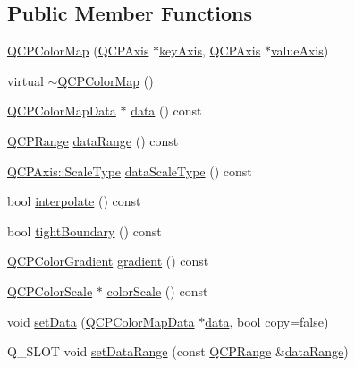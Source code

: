 \subsection*{Public Member Functions}
\begin{DoxyCompactItemize}
\item 
\hyperlink{class_q_c_p_color_map_aa37e976d2ee1e2be6c4cd88a64b36215}{Q\+C\+P\+Color\+Map} (\hyperlink{class_q_c_p_axis}{Q\+C\+P\+Axis} $\ast$\hyperlink{class_q_c_p_abstract_plottable_a72c7a09c22963f2c943f07112b311103}{key\+Axis}, \hyperlink{class_q_c_p_axis}{Q\+C\+P\+Axis} $\ast$\hyperlink{class_q_c_p_abstract_plottable_a3106f9d34d330a6097a8ec5905e5b519}{value\+Axis})
\item 
virtual \hyperlink{class_q_c_p_color_map_ac8a952a40fed62dcee33405b0f4d47ad}{$\sim$\+Q\+C\+P\+Color\+Map} ()
\item 
\hyperlink{class_q_c_p_color_map_data}{Q\+C\+P\+Color\+Map\+Data} $\ast$ \hyperlink{class_q_c_p_color_map_a3ae12c9ce842352037cd20ea5267414f}{data} () const 
\item 
\hyperlink{class_q_c_p_range}{Q\+C\+P\+Range} \hyperlink{class_q_c_p_color_map_a37cc8e821e070697e15652f6419fab48}{data\+Range} () const 
\item 
\hyperlink{class_q_c_p_axis_a36d8e8658dbaa179bf2aeb973db2d6f0}{Q\+C\+P\+Axis\+::\+Scale\+Type} \hyperlink{class_q_c_p_color_map_a5ffc703dc603c4fd942f36ea51b8c48d}{data\+Scale\+Type} () const 
\item 
bool \hyperlink{class_q_c_p_color_map_a39019675a7ad00efad7212b96c0ccc95}{interpolate} () const 
\item 
bool \hyperlink{class_q_c_p_color_map_aa1d9aa8db73a5942881f6f6c5afdbb0f}{tight\+Boundary} () const 
\item 
\hyperlink{class_q_c_p_color_gradient}{Q\+C\+P\+Color\+Gradient} \hyperlink{class_q_c_p_color_map_a9f967a971474e32345290b79cf107809}{gradient} () const 
\item 
\hyperlink{class_q_c_p_color_scale}{Q\+C\+P\+Color\+Scale} $\ast$ \hyperlink{class_q_c_p_color_map_a6bd82e0b042a2ec4d64f40853a3b05e3}{color\+Scale} () const 
\item 
void \hyperlink{class_q_c_p_color_map_a5a23e133a20c4ccad35fd32e6c0f9809}{set\+Data} (\hyperlink{class_q_c_p_color_map_data}{Q\+C\+P\+Color\+Map\+Data} $\ast$\hyperlink{class_q_c_p_color_map_a3ae12c9ce842352037cd20ea5267414f}{data}, bool copy=false)
\item 
Q\+\_\+\+S\+L\+O\+T void \hyperlink{class_q_c_p_color_map_a980b42837821159786a85b4b7dcb8774}{set\+Data\+Range} (const \hyperlink{class_q_c_p_range}{Q\+C\+P\+Range} \&\hyperlink{class_q_c_p_color_map_a37cc8e821e070697e15652f6419fab48}{data\+Range})

\end{DoxyCompactItemize}
